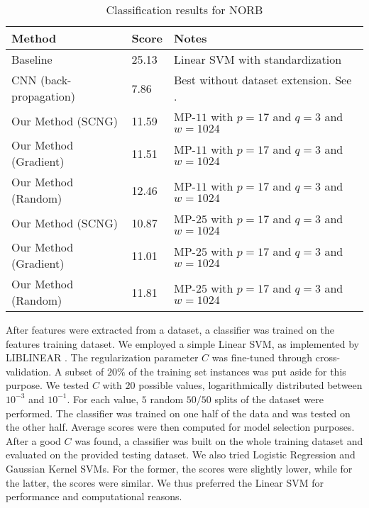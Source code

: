 \documentclass[runningheads,a4paper]{llncs}
\begin{document}
\renewcommand{\arraystretch}{1.2}
\begin{table}[h!]
  \caption{Classification results for NORB}
  \label{table:ResultsNORB}
  \begin{tabularx}{\textwidth}{|l|l|X|}
    \hline
    \textbf{Method} & \textbf{Score} & \textbf{Notes} \\ \hline\hline
    Baseline & 25.13 & Linear SVM with standardization \\ \hline
    CNN (back-propagation) & 7.86 & Best without dataset extension. See \cite{high-performance-neural-networks-visual-classification}. \\ \hline
    Our Method (SCNG) & 11.59 & MP-$11$ with $p=17$ and $q=3$ and $w=1024$ \\ \hline
    Our Method (Gradient) & 11.51 & MP-$11$ with $p=17$ and $q=3$ and $w=1024$ \\ \hline
    Our Method (Random) & 12.46 & MP-$11$ with $p=17$ and $q=3$ and $w=1024$ \\ \hline
    Our Method (SCNG) & 10.87 & MP-$25$ with $p=17$ and $q=3$ and $w=1024$ \\ \hline
    Our Method (Gradient) & 11.01 & MP-$25$ with $p=17$ and $q=3$ and $w=1024$ \\ \hline
    Our Method (Random) & 11.81 & MP-$25$ with $p=17$ and $q=3$ and $w=1024$ \\ \hline
  \end{tabularx}
\end{table}
\renewcommand{\arraystretch}{1.0}

After features were extracted from a dataset, a classifier was trained on the features training dataset. We employed a simple Linear SVM, as implemented by LIBLINEAR \cite{liblinear}. The regularization parameter $C$ was fine-tuned through cross-validation. A subset of $20\%$ of the training set instances was put aside for this purpose. We tested $C$ with $20$ possible values, logarithmically distributed between $10^{-3}$ and $10^{-1}$. For each value, $5$ random $50/50$ splits of the dataset were performed. The classifier was trained on one half of the data and was tested on the other half. Average scores were then computed for model selection purposes. After a good $C$ was found, a classifier was built on the whole training dataset and evaluated on the provided testing dataset. We also tried Logistic Regression and Gaussian Kernel SVMs. For the former, the scores were slightly lower, while for the latter, the scores were similar. We thus preferred the Linear SVM for performance and computational reasons.
\end{document}
